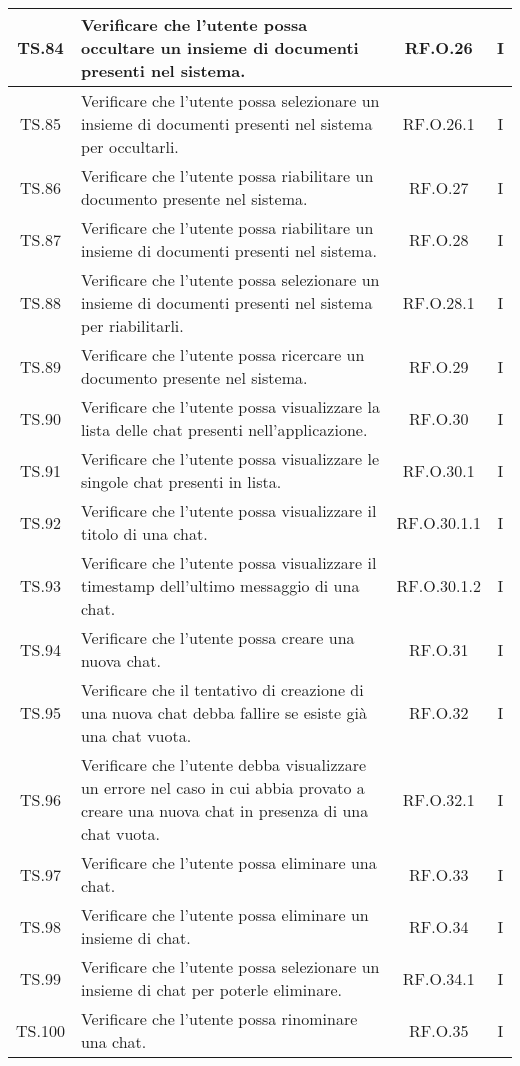 {{{{{{{{{{\begin{xltabular}{\textwidth}{|c|X|c|c|}
\hline
TS.84 & Verificare che l'utente possa occultare un insieme di documenti presenti nel sistema. & RF.O.26 & I \\
\hline
TS.85 & Verificare che l'utente possa selezionare un insieme di documenti presenti nel sistema per occultarli. & RF.O.26.1 & I \\
\hline
TS.86 & Verificare che l'utente possa riabilitare un documento presente nel sistema. & RF.O.27 & I \\
\hline
TS.87 & Verificare che l'utente possa riabilitare un insieme di documenti presenti nel sistema. & RF.O.28 & I \\
\hline
TS.88 & Verificare che l'utente possa selezionare un insieme di documenti presenti nel sistema per riabilitarli. & RF.O.28.1 & I \\
\hline
TS.89 & Verificare che l'utente possa ricercare un documento presente nel sistema. & RF.O.29 & I \\
\hline
TS.90 & Verificare che l'utente possa visualizzare la lista delle chat presenti nell’applicazione. & RF.O.30 & I \\
\hline
TS.91 & Verificare che l'utente possa visualizzare le singole chat presenti in lista. & RF.O.30.1 & I \\
\hline
TS.92 & Verificare che l'utente possa visualizzare il titolo di una chat. & RF.O.30.1.1 & I \\
\hline
TS.93 & Verificare che l'utente possa visualizzare il timestamp dell’ultimo messaggio di una chat. & RF.O.30.1.2 & I \\
\hline
TS.94 & Verificare che l'utente possa creare una nuova chat. & RF.O.31 & I \\
\hline
TS.95 & Verificare che il tentativo di creazione di una nuova chat debba fallire se esiste già una chat vuota. & RF.O.32 & I \\
\hline
TS.96 & Verificare che l'utente debba visualizzare un errore nel caso in cui abbia provato a creare una nuova chat in presenza di una chat vuota. & RF.O.32.1 & I \\
\hline
TS.97 & Verificare che l'utente possa eliminare una chat. & RF.O.33 & I \\
\hline
TS.98 & Verificare che l'utente possa eliminare un insieme di chat. & RF.O.34 & I \\
\hline
TS.99 & Verificare che l'utente possa selezionare un insieme di chat per poterle eliminare. & RF.O.34.1 & I \\
\hline
TS.100 & Verificare che l'utente possa rinominare una chat. & RF.O.35 & I \\

\end{xltabular}}}}}}}}}}}
